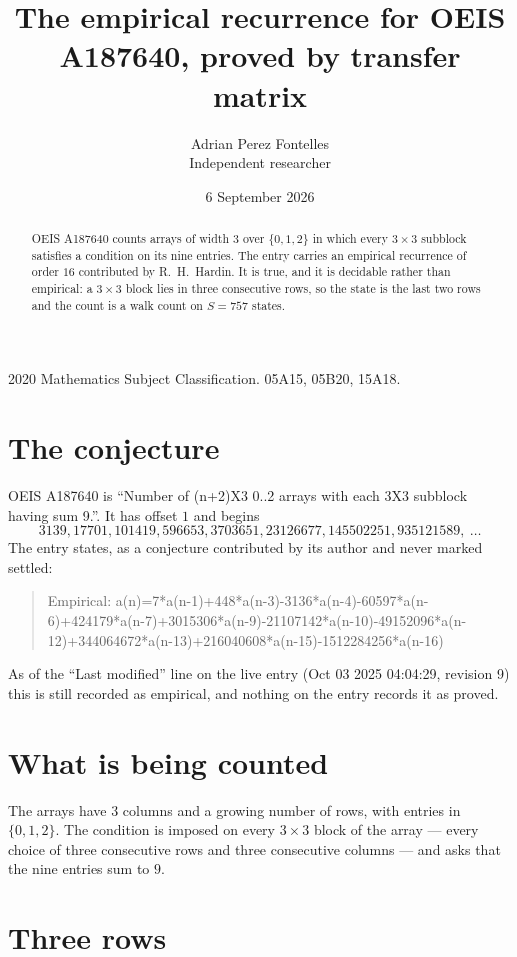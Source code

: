 \documentclass[11pt,a4paper]{article}
\title{The empirical recurrence for OEIS A187640, proved by transfer matrix}
\author{Adrian Perez Fontelles\\ \small Independent researcher}
\date{6 September 2026}
\theoremstyle{plain}
\theoremstyle{definition}
\begin{document}
\maketitle

\begin{abstract}
OEIS A187640 counts arrays of width $3$ over $\{0,1,2\}$ in which every $3\times3$ subblock
satisfies a condition on its nine entries. The entry carries an empirical recurrence of order
$16$ contributed by R.~H.~Hardin. It is true, and it is decidable rather than empirical: a
$3\times3$ block lies in three consecutive rows, so the state is the last two rows and the
count is a walk count on $S=757$ states.
\end{abstract}

\noindent\small 2020 Mathematics Subject Classification. 05A15, 05B20, 15A18.\normalsize

\section{The conjecture}

OEIS A187640 is ``Number of (n+2)X3 0..2 arrays with each 3X3 subblock having sum 9.''. It has offset $1$ and begins
\[
3139, 17701, 101419, 596653, 3703651, 23126677, 145502251, 935121589,\ \dots
\]
The entry states, as a conjecture contributed by its author and never marked settled:
\begin{quote}
Empirical: a(n)=7*a(n-1)+448*a(n-3)-3136*a(n-4)-60597*a(n-6)+424179*a(n-7)+3015306*a(n-9)-21107142*a(n-10)-49152096*a(n-12)+344064672*a(n-13)+216040608*a(n-15)-1512284256*a(n-16)
\end{quote}
As of the ``Last modified'' line on the live entry (Oct 03 2025 04:04:29, revision 9) this is still
recorded as empirical, and nothing on the entry records it as proved.

\section{What is being counted}

The arrays have $3$ columns and a growing number of rows, with entries in $\{0,1,2\}$. The
condition is imposed on every $3\times3$ block of the array --- every choice of three
consecutive rows and three consecutive columns --- and asks that the nine entries sum to $9$.



\section{Three rows}
\end{document}
